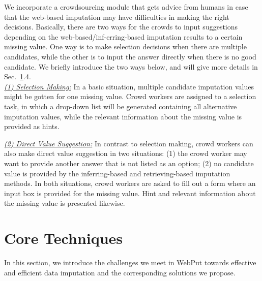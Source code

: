 \documentclass[sigconf]{acmart}
\begin{document}
We incorporate a crowdsourcing module that gets advice from humans in case that the web-based imputation may have difficulties in making the right decisions. Basically, there are two ways for the crowds to input suggestions depending on the web-based/inf-erring-based imputation results to a certain missing value. One way is to make selection decisions when there are multiple candidates, while the other is to input the answer directly when there is no good candidate. We briefly introduce the two ways below, and will give more details in Sec.~\ref{section:core}.4.\\
\noindent\underline{\it (1) Selection Making:}
In a basic situation, multiple candidate imputation values might be gotten for one missing value. Crowd workers are assigned to a selection task, in which a drop-down list will be generated containing all alternative imputation values, while the relevant information about the missing value is provided as hints. %

\noindent\underline{\it (2) Direct Value Suggestion:}
In contrast to selection making, crowd workers can also make direct value suggestion in two situations: (1) the crowd worker may want to provide another answer that is not listed as an option; (2) no candidate value is provided by the inferring-based and retrieving-based imputation methods. In both situations, crowd workers are asked to fill out a form where an input box is provided for the missing value. Hint and relevant information about the missing value is presented likewise.


%



\section{Core Techniques}
\label{section:core}
In this section, we introduce the challenges we meet in WebPut towards effective and efficient data imputation and the corresponding solutions we propose.
\end{document}
